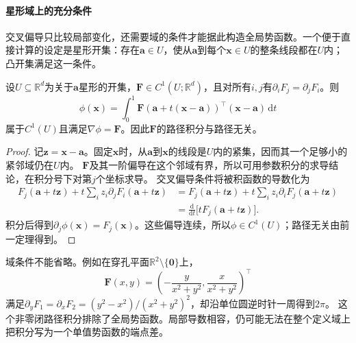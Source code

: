 \paragraph{星形域上的充分条件}

交叉偏导只比较局部变化，还需要域的条件才能据此构造全局势函数。一个便于直接计算的设定是星形开集：存在$\bm a\in U$，使从$\bm a$到每个$\bm x\in U$的整条线段都在$U$内；凸开集满足这一条件。
\begin{theorem}[星形域上势函数的构造]
设$U\subseteq\mathbb R^d$为关于$\bm a$星形的开集，$\bm F\in C^1(U;\mathbb R^d)$，且对所有$i,j$有$\partial_iF_j=\partial_jF_i$。则
\[
 \phi(\bm x)=\int_0^1\bm F(\bm a+t(\bm x-\bm a))^\top(\bm x-\bm a)\,\mathrm dt
\]
属于$C^1(U)$且满足$\nabla\phi=\bm F$。因此$\bm F$的路径积分与路径无关。
\end{theorem}
\begin{proof}
记$\bm z=\bm x-\bm a$。固定$\bm x$时，从$\bm a$到$\bm x$的线段是$U$内的紧集，因而其一个足够小的紧邻域仍在$U$内。
$\bm F$及其一阶偏导在这个邻域有界，所以可用参数积分的求导结论，在积分号下对第$j$个坐标求导。
交叉偏导条件将被积函数的导数化为
\[
 \begin{aligned}
 F_j(\bm a+t\bm z)+t\sum_i z_i\partial_jF_i(\bm a+t\bm z)
 &=F_j(\bm a+t\bm z)+t\sum_i z_i\partial_iF_j(\bm a+t\bm z)\\
 &=\frac{\mathrm d}{\mathrm dt}\bigl[tF_j(\bm a+t\bm z)\bigr].
 \end{aligned}
\]
积分后得到$\partial_j\phi(\bm x)=F_j(\bm x)$。这些偏导连续，所以$\phi\in C^1(U)$；路径无关由前一定理得到。
\end{proof}

域条件不能省略。例如在穿孔平面$\mathbb R^2\setminus\{\bm0\}$上，
\[
 \bm F(x,y)=\left(-\frac{y}{x^2+y^2},\frac{x}{x^2+y^2}\right)^\top
\]
满足$\partial_yF_1=\partial_xF_2=(y^2-x^2)/(x^2+y^2)^2$，却沿单位圆逆时针一周得到$2\pi$。
这个非零闭路径积分排除了全局势函数。局部导数相容，仍可能无法在整个定义域上把积分写为一个单值势函数的端点差。

\FloatBarrier
